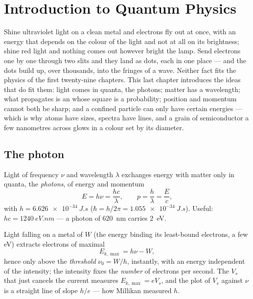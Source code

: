 \chapter{Introduction to Quantum Physics}\label{ch:b1:quantum-introduction}

Shine ultraviolet light on a clean metal and electrons fly out at
once, with an energy that depends on the colour of the light and not at
all on its brightness; shine red light and nothing comes out however
bright the lamp. Send electrons one by one through two slits and they
land as dots, each in one place --- and the dots build up, over
thousands, into the fringes of a wave. Neither fact fits the physics
of the first twenty-nine chapters. This last chapter introduces the
ideas that do fit them: light comes in quanta, the photons; matter has
a wavelength; what propagates is an  whose square is a
probability; position and momentum cannot both be sharp; and a
confined particle can only have certain energies --- which is why atoms
have sizes, spectra have lines, and a grain of semiconductor a few
nanometres across glows in a colour set by its diameter.

\section{The photon}

\begin{theorem}\label{thm:b1:quantum-introduction:photon}
Light of frequency $\nu$ and wavelength $\lambda$ exchanges energy with
matter only in quanta, the \emph{photons}, of energy and momentum
\[
E = h\nu = \frac{hc}{\lambda} , \qquad p = \frac{h}{\lambda} = \frac{E}{c} ,
\]
with \emph{} $h = \qty{6.626e-34}{J.s}$ ($\hbar = h/2\pi =
\qty{1.055e-34}{J.s}$). Useful: $hc = \qty{1240}{eV.nm}$ --- a photon of
\qty{620}{nm} carries \qty{2}{eV}.
\end{theorem}
\admitted

\begin{proposition}\label{prop:b1:quantum-introduction:photoelectric}
Light falling on a metal of \emph{} $W$ (the energy
binding its least-bound electrons, a few eV) extracts electrons of
maximal 
\[
E_{k,\max} = h\nu - W ,
\]
hence only above the \emph{threshold} $\nu_0 = W/h$, instantly, with an
energy independent of the intensity; the intensity fixes the
\emph{number} of electrons per second. The \emph{}
$V_s$ that just cancels the current measures $E_{k,\max} = eV_s$, and
the plot of $V_s$ against $\nu$ is a straight line of slope $h/e$ --- how
Millikan measured $h$.
\end{proposition}

